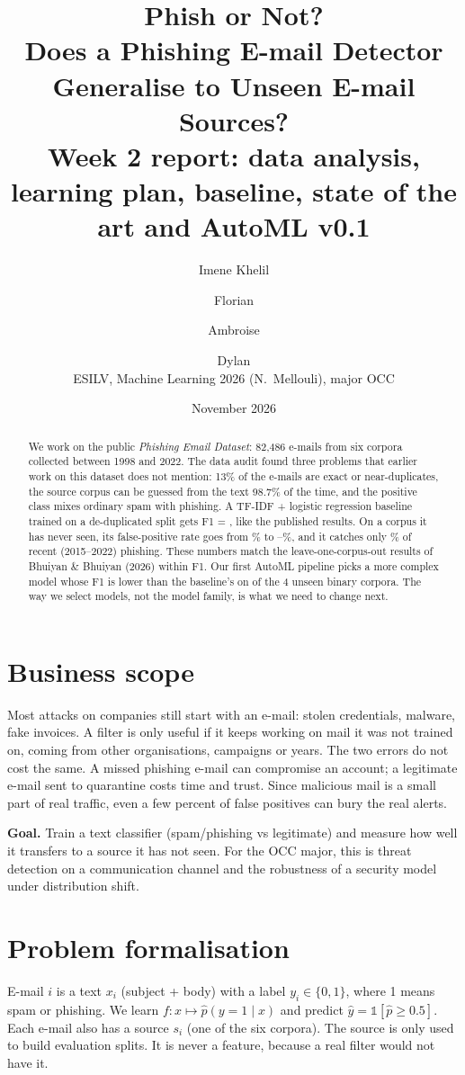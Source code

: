 \documentclass[11pt,a4paper]{article}
\title{\textbf{Phish or Not?}\\[2pt]\large Does a Phishing E-mail Detector Generalise to Unseen E-mail Sources?\\[4pt]
\normalsize Week 2 report: data analysis, learning plan, baseline, state of the art and AutoML v0.1}
\author{Imene Khelil \and Florian \and Ambroise \and Dylan\\[2pt]\small ESILV, Machine Learning 2026 (N.~Mellouli), major OCC}
\date{November 2026}
\begin{document}
\maketitle

\begin{abstract}
\noindent We work on the public \emph{Phishing Email Dataset}: 82,486 e-mails from six corpora collected between 1998 and 2022. The data audit found three problems that earlier work on this dataset does not mention: 13\% of the e-mails are exact or near-duplicates, the source corpus can be guessed from the text 98.7\% of the time, and the positive class mixes ordinary spam with phishing. A TF-IDF + logistic regression baseline trained on a de-duplicated split gets F1 = \baseFone{}, like the published results. On a corpus it has never seen, its false-positive rate goes from \baseFPR\% to \losoFPRmin--\losoFPRmax\%, and it catches only \nazRecallPct\% of recent (2015--2022) phishing. These numbers match the leave-one-corpus-out results of Bhuiyan \& Bhuiyan (2026) within \sotaFoneDiffMax{} F1. Our first AutoML pipeline picks a more complex model whose F1 is lower than the baseline's on \autoFoneWorse{} of the 4 unseen binary corpora. The way we select models, not the model family, is what we need to change next.
\end{abstract}

\section{Business scope}
Most attacks on companies still start with an e-mail: stolen credentials, malware, fake invoices. A filter is only useful if it keeps working on mail it was not trained on, coming from other organisations, campaigns or years. The two errors do not cost the same. A missed phishing e-mail can compromise an account; a legitimate e-mail sent to quarantine costs time and trust. Since malicious mail is a small part of real traffic, even a few percent of false positives can bury the real alerts.

\textbf{Goal.} Train a text classifier (spam/phishing vs legitimate) and measure how well it transfers to a source it has not seen. For the OCC major, this is threat detection on a communication channel and the robustness of a security model under distribution shift.

\section{Problem formalisation}
E-mail $i$ is a text $x_i$ (subject + body) with a label $y_i\in\{0,1\}$, where 1 means spam or phishing. We learn $f:x\mapsto \hat p(y{=}1\mid x)$ and predict $\hat y = \mathbb{1}[\hat p \ge 0.5]$. Each e-mail also has a source $s_i$ (one of the six corpora). The source is only used to build evaluation splits. It is never a feature, because a real filter would not have it.
\end{document}

